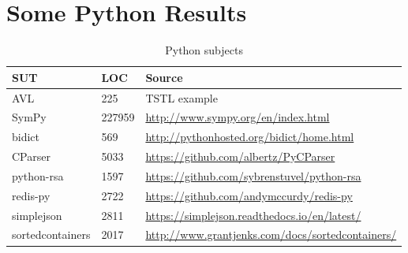 \section{Some Python Results}


\begin{table}
\centering
\caption{Python subjects}
\label{tab:subjects}
{\scriptsize
\begin{tabular}{l|ll}
SUT & LOC & Source \\
\hline
AVL & 225 & TSTL example \cite{avltree} \\
SymPy & 227959 & \url{http://www.sympy.org/en/index.html} \\
bidict & 569 & \url{http://pythonhosted.org/bidict/home.html} \\
CParser & 5033 & \url{https://github.com/albertz/PyCParser}\\
python-rsa & 1597 & \url{https://github.com/sybrenstuvel/python-rsa} \\
redis-py & 2722 & \url{https://github.com/andymccurdy/redis-py}\\
simplejson & 2811 & \url{https://simplejson.readthedocs.io/en/latest/} \\
sortedcontainers & 2017 & \url{http://www.grantjenks.com/docs/sortedcontainers/} \\
\end{tabular}
}
\end{table}

\newpage

